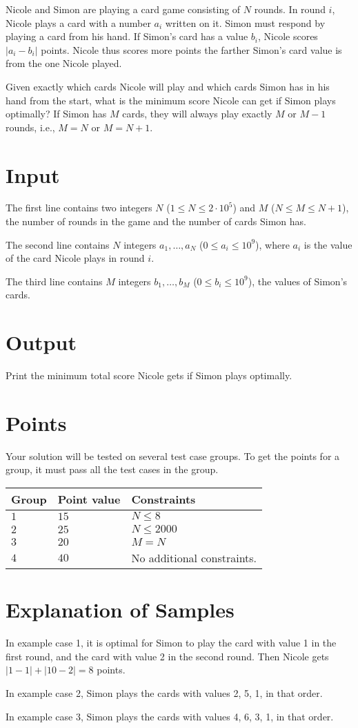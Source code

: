 \noindent
Nicole and Simon are playing a card game consisting of $N$ rounds.
In round $i$, Nicole plays a card with a number $a_i$ written on it.
Simon must respond by playing a card from his hand.
If Simon's card has a value $b_i$, Nicole scores $|a_i - b_i|$ points.
Nicole thus scores more points the farther Simon's card value is from the one Nicole played.

Given exactly which cards Nicole will play and which cards Simon has in his hand from the start, what is the minimum score Nicole can get if Simon plays optimally?
If Simon has $M$ cards, they will always play exactly $M$ or $M - 1$ rounds, i.e., $M = N$ or $M = N + 1$.

\section*{Input}
The first line contains two integers $N$ ($1 \leq N \leq 2 \cdot 10^5$) and $M$ ($N \leq M \leq N+1$), the number of rounds in the game and the number of cards Simon has.

The second line contains $N$ integers $a_1, \dots, a_N$ ($0 \le a_i \le 10^9$), where $a_i$ is the value of the card Nicole plays in round $i$.

The third line contains $M$ integers $b_1, \dots, b_M$ ($0 \le b_i \le 10^9$), the values of Simon's cards.

\section*{Output}
Print the minimum total score Nicole gets if Simon plays optimally.

\section*{Points}
Your solution will be tested on several test case groups.
To get the points for a group, it must pass all the test cases in the group.

\noindent
\begin{tabular}{| l | l | l |}
  \hline
  \textbf{Group} & \textbf{Point value} & \textbf{Constraints} \\ \hline
  $1$   & $15$       & $N \leq 8 $\\ \hline
  $2$   & $25$       & $N \leq 2000 $  \\ \hline
  $3$   & $20$       & $M=N$ \\ \hline
  $4$   & $40$       & No additional constraints. \\ \hline
\end{tabular}

\section*{Explanation of Samples}
In example case 1, it is optimal for Simon to play the card with value 1 in the first round, and the card with value 2 in the second round. Then Nicole gets $|1-1| + |10-2| = 8$ points.

In example case 2, Simon plays the cards with values 2, 5, 1, in that order.

In example case 3, Simon plays the cards with values 4, 6, 3, 1, in that order.
